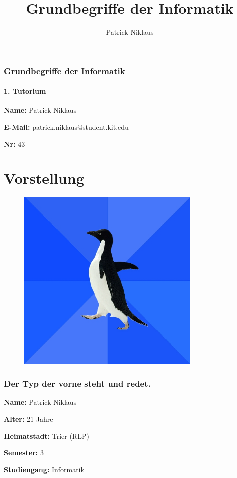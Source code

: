 \documentclass{beamer}
\title{Grundbegriffe der Informatik}
\author{Patrick Niklaus}
\begin{document}
\begin{frame}
  \frametitle{Grundbegriffe der Informatik}
  \framesubtitle{1. Tutorium}
  \begin{description}
    \item \textbf{Name:} Patrick Niklaus
    \item \textbf{E-Mail:} patrick.niklaus@student.kit.edu
    \item \textbf{Nr:} 43
  \end{description}
\end{frame}

\section{Vorstellung}
\begin{frame}[plain]
  \begin{figure}
    \begin{center} \pause
      \includegraphics[width=250pt]{sap}
    \end{center}
  \end{figure}
\end{frame}

\begin{frame}
  \frametitle{Der Typ der vorne steht und redet.}
  \begin{description}
    \item \textbf{Name:} Patrick Niklaus
    \item \textbf{Alter:} 21 Jahre
    \item \textbf{Heimatstadt:} Trier (RLP)
    \item \textbf{Semester:} 3
    \item \textbf{Studiengang:} Informatik
  \end{description}
\end{frame}
\end{document}
